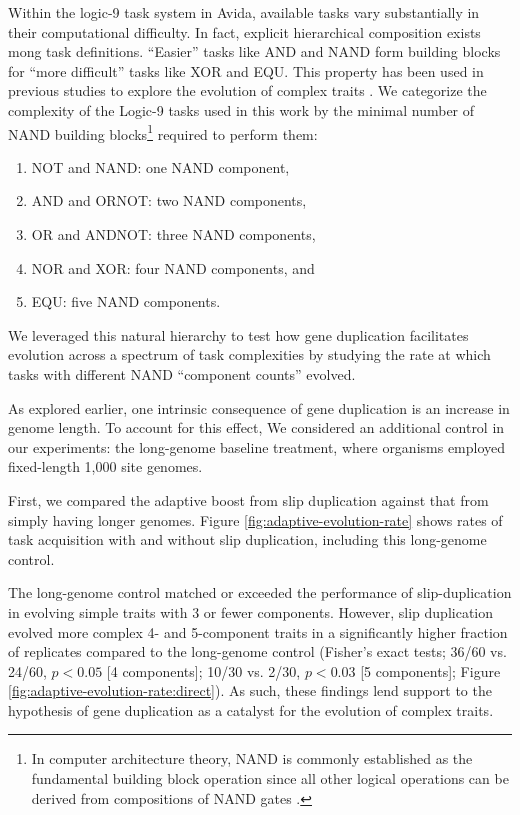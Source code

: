 Within the logic-9 task system in Avida, available tasks vary substantially in their computational difficulty.
In fact, explicit hierarchical composition exists mong task definitions.
``Easier'' tasks like AND and NAND form building blocks for ``more difficult'' tasks like XOR and EQU.
This property has been used in previous studies to explore the evolution of complex traits \citep{lenski2003evolution}.
We categorize the complexity of the Logic-9 tasks used in this work by the minimal number of NAND building blocks\footnote{
In computer architecture theory, NAND is commonly established as the fundamental building block operation since all other logical operations can be derived from compositions of NAND gates \citep{TODO}.
} required to perform them:
\begin{enumerate}
\item NOT and NAND: one NAND component,
\item AND and ORNOT: two NAND components,
\item OR and ANDNOT: three NAND components,
\item NOR and XOR: four NAND components, and
\item EQU: five NAND components.
\end{enumerate}
We leveraged this natural hierarchy to test how gene duplication facilitates evolution across a spectrum of task complexities by studying the rate at which tasks with different NAND ``component counts'' evolved.

As explored earlier, one intrinsic consequence of gene duplication is an increase in genome length.
To account for this effect, We considered an additional control in our experiments: the long-genome baseline treatment, where organisms employed fixed-length 1,000 site genomes.



First, we compared the adaptive boost from slip duplication against that from simply having longer genomes.
Figure \ref{fig:adaptive-evolution-rate} shows rates of task acquisition with and without slip duplication, including this long-genome control.

The long-genome control matched or exceeded the performance of slip-duplication in evolving simple traits with 3 or fewer components.
However, slip duplication evolved more complex 4- and 5-component traits in a significantly higher fraction of replicates compared to the long-genome control (Fisher's exact tests; 36/60 vs. 24/60, $p<0.05$ [4 components]; 10/30 vs. 2/30, $p<0.03$ [5 components]; Figure \ref{fig:adaptive-evolution-rate:direct}).
As such, these findings lend support to the hypothesis of gene duplication as a catalyst for the evolution of complex traits.

